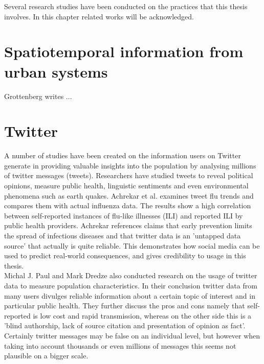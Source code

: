 Several research studies have been conducted on the practices that this thesis involves. In this chapter related works will be acknowledged.

\section{Spatiotemporal information from urban systems}
Grottenberg writes ... \cite{spatiotemp_urban_sys}

\section{Twitter}
A number of studies have been created on the information users on Twitter generate in providing valuable insights into the population by analysing millions of twitter messages (tweets). Researchers have studied tweets to reveal political opinions\cite{twitter_politic}, measure public health\cite{twitter_flu_trends}, linguistic sentiments\cite{twitter_linguistics} and even environmental phenomena such as earth quakes\cite{twitter_earthQuake}. Achrekar et al.\cite{twitter_flu_trends} examines tweet flu trends and compares them with actual influenza data. The results show a high correlation between self-reported instances of flu-like illnesses (ILI) and reported ILI by public health providers. Achrekar references claims that early prevention limits the spread of infectious diseases and that twitter data is an 'untapped data source' that actually is quite reliable. This demonstrates how social media can be  used to predict real-world consequences, and gives credibility to usage in this thesis. \\Michal J. Paul and Mark Dredze \cite{twitter_what_you_tweet} also conducted research on the usage of twitter data to measure population characteristics. In their conclusion twitter data from many users divulges reliable information about a certain topic of interest and in particular public health. They further discuss the pros and cons namely that self-reported is low cost and rapid transmission, whereas on the other side this is a 'blind authorship, lack of source citation and presentation of opinion as fact'. Certainly twitter messages may be false on an individual level, but however when taking into account thousands or even millions of messages this seems not plausible on a bigger scale.